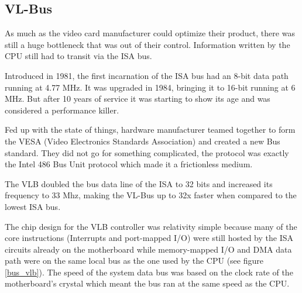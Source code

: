 \subsection{VL-Bus}
As much as the video card manufacturer could optimize their product, there was still a huge bottleneck that was out of their control. Information written by the CPU still had to transit via the ISA bus.\\
\par
 Introduced in 1981, the first incarnation of the ISA bus had an 8-bit data path running at 4.77 MHz. It was upgraded in 1984, bringing it to 16-bit running at 6 MHz. But after 10 years of service it was starting to show its age and was considered a performance killer.\\
\par
{}
\par
Fed up with the state of things, hardware manufacturer teamed together to form the VESA (Video Electronics Standards Association) and created a new Bus standard. They did not go for something complicated, the protocol was exactly the Intel 486 Bus Unit protocol which made it a frictionless medium.\\
\par 
The VLB doubled the bus data line of the ISA to 32 bits and increased its frequency to 33 Mhz, making the VL-Bus up to 32x faster when compared to the lowest ISA bus.\\
\par
The chip design for the VLB controller was relativity simple because many of the core instructions (Interrupts and port-mapped I/O) were still hosted by the ISA circuits already on the motherboard while memory-mapped I/O and DMA data path were on the same local bus as the one used by the CPU (see figure \ref{bus_vlb}). The speed of the system data bus was based on the clock rate of the motherboard's crystal which meant the bus ran at the same speed as the CPU.\\
\par
{}
\label{vlbarchitecture}

